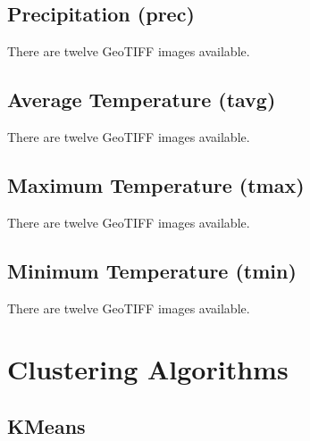 \documentclass[a4paper,14pt] {report}
\begin{document}
	\section{Precipitation (prec)}
	There are twelve GeoTIFF images available.
	
	\section{Average Temperature (tavg)}
	There are twelve GeoTIFF images available.
	
	\section{Maximum Temperature (tmax)}
	There are twelve GeoTIFF images available.
	
	\section{Minimum Temperature (tmin)}
	There are twelve GeoTIFF images available.
	
	\chapter{Clustering Algorithms}
	\section{KMeans}
\end{document}
